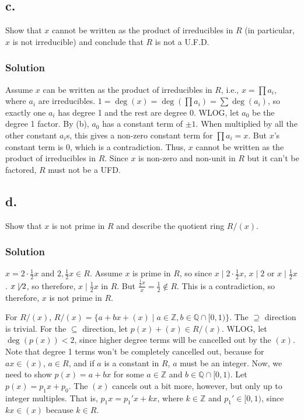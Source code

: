 \documentclass[fleqn]{article}
\begin{document}
        \subsection{c.}
        Show that $x$ cannot be written as the product of irreducibles in $R$ (in particular, $x$ is not irreducible) and conclude that $R$ is not a U.F.D.
            
            \subsubsection{Solution}
            Assume $x$ can be written as the product of irreducibles in $R$, i.e., $x = \prod a_i$, where $a_i$ are irreducibles.  $1 = \deg(x) = \deg(\prod a_i) = \sum \deg(a_i)$, so exactly one $a_i$ has degree 1 and the rest are degree 0.  WLOG, let $a_0$ be the degree 1 factor.  By (b), $a_0$ has a constant term of $\pm 1$.  When multiplied by all the other constant $a_i$s, this gives a non-zero constant term for $\prod a_i = x$.  But $x$'s constant term is 0, which is a contradiction.  Thus, $x$ cannot be written as the product of irreducibles in $R$.  Since $x$ is non-zero and non-unit in $R$ but it can't be factored, $R$ must not be a UFD.
        
        \subsection{d.}
        Show that $x$ is not prime in $R$ and describe the quotient ring $R/(x)$.
            
            \subsubsection{Solution}
            $x = 2 \cdot \frac{1}{2} x$ and $2, \frac{1}{2} x \in R$.  Assume $x$ is prime in $R$, so since $x \mid 2 \cdot \frac{1}{2} x$, $x \mid 2$ or $x \mid \frac{1}{2} x$.  $x \not\mid 2$, so therefore, $x \mid \frac{1}{2} x$ in $R$.  But $\frac{\frac{1}{2} x}{x} = \frac{1}{2} \notin R$.  This is a contradiction, so therefore, $x$ is not prime in $R$.
            
            For $R/(x)$, $R/(x) = \{a + bx + (x) \mid a \in \mathbb{Z}, b \in \mathbb{Q} \cap [0, 1)\}$.  The $\supseteq$ direction is trivial.  For the $\subseteq$ direction, let $p(x) + (x) \in R/(x)$.  WLOG, let $\deg(p(x)) < 2$, since higher degree terms will be cancelled out by the $(x)$.  Note that degree 1 terms won't be completely cancelled out, because for $ax \in (x)$, $a \in R$, and if $a$ is a constant in $R$, $a$ must be an integer.  Now, we need to show $p(x) = a + bx$ for some $a \in \mathbb{Z}$ and $b \in \mathbb{Q} \cap [0, 1)$.  Let $p(x) = p_1 x + p_0$.  The $(x)$ cancels out a bit more, however, but only up to integer multiples.  That is, $p_1 x = p_1' x + kx$, where $k \in \mathbb{Z}$ and $p_1' \in [0, 1)$, since $kx \in (x)$ because $k \in R$.
    
\end{document}

